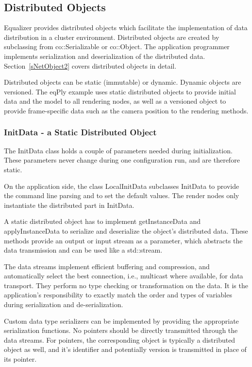 \documentclass[10pt,a4]{scrartcl}
\newcommand{\sref}[1]{Section~\ref{#1}}
\begin{document}
\subsection{\label{sNetObject}Distributed Objects}

Equalizer provides distributed objects which facilitate the implementation of
data distribution in a cluster environment. Distributed objects are created by
subclassing from \textsf{co::Serializable} or \textsf{co::Object}. The
application programmer implements serialization and deserialization of the
distributed data. \sref{sNetObject2} covers distributed objects in detail.

Distributed objects can be static (immutable) or dynamic. Dynamic objects are
versioned. The \textsf{eqPly} example uses static distributed objects to provide
initial data and the model to all rendering nodes, as well as a versioned object
to provide frame-specific data such as the camera position to the rendering
methods.

\subsubsection{\label{sInitData}InitData - a Static Distributed Object}

The \textsf{InitData} class holds a couple of parameters needed during
initialization. These parameters never change during one configuration
run, and are therefore static.

On the application side, the class \textsf{LocalInitData} subclasses
\textsf{InitData} to provide the command line parsing and to set the
default values. The render nodes only instantiate the distributed part
in \textsf{InitData}.

A static distributed object has to implement \textsf{getInstanceData}
and \textsf{applyInstanceData} to serialize and deserialize the object's
distributed data. These methods provide an output or input stream as a
parameter, which abstracts the data transmission and can be used like a
\textsf{std::stream}.

The data streams implement efficient buffering and compression, and
automatically select the best connection, i.e., multicast where available, for
data transport. They perform no type checking or transformation on the data. It
is the application's responsibility to exactly match the order and types of
variables during serialization and de-serialization.

Custom data type serializers can be implemented by providing the
appropriate serialization functions. No pointers should be directly
transmitted through the data streams. For pointers, the corresponding
object is typically a distributed object as well, and it's identifier
and potentially version is transmitted in place of its pointer.
\end{document}
